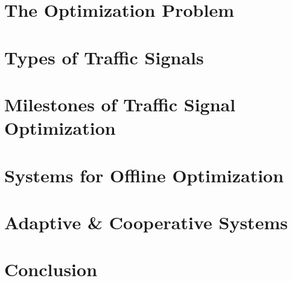 \documentclass [a4paper, 10pt]{article}
\begin{document}
\section{The Optimization Problem}


\section{Types of Traffic Signals}


%

\section{Milestones of Traffic Signal Optimization}


\section{Systems for Offline Optimization}


\section{Adaptive \& Cooperative Systems}


%

\section{Conclusion}




\end{document}
